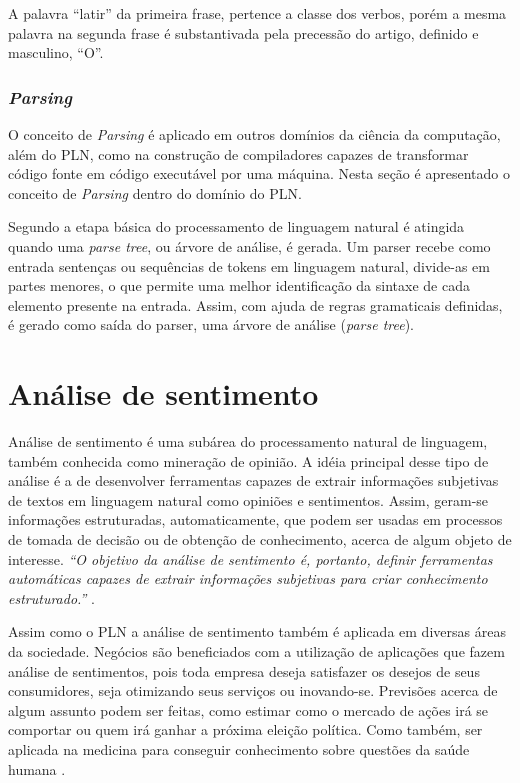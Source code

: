 A palavra “latir” da primeira frase, pertence a classe dos verbos, porém a mesma palavra na segunda frase é substantivada pela precessão do artigo, definido e masculino, “O”.

\subsubsection{\textit{Parsing}}

O conceito de \textit{Parsing} é aplicado em outros domínios da ciência da computação, além do PLN, como na construção de compiladores capazes de transformar código fonte em código executável por uma máquina. Nesta seção é apresentado o conceito de  \textit{Parsing} dentro do domínio do PLN.

Segundo \cite{tecnicasPLNRanjan:16} a etapa básica do processamento de linguagem natural é atingida quando uma \textit{parse tree}, ou árvore de análise, é gerada. Um parser recebe como entrada sentenças ou sequências de tokens em linguagem natural, divide-as em partes menores, o que permite uma melhor identificação da sintaxe de cada elemento presente na entrada. Assim, com ajuda de regras gramaticais definidas, é gerado como saída do parser, uma árvore de análise (\textit{parse tree}).

\section{Análise de sentimento}

Análise de sentimento é uma subárea do processamento natural de linguagem, também conhecida como mineração de opinião. A idéia principal desse tipo de análise é a de desenvolver ferramentas capazes de extrair informações subjetivas de textos em linguagem natural como opiniões e sentimentos. Assim, geram-se informações estruturadas, automaticamente, que podem ser usadas em processos de tomada de decisão ou de obtenção de conhecimento, acerca de algum objeto de interesse. \textit{“O objetivo da análise de sentimento é, portanto, definir ferramentas automáticas capazes de extrair informações subjetivas para criar conhecimento estruturado.”} \cite[tradução do autor]{Pozzi20171}.

Assim como o PLN a análise de sentimento também é aplicada em diversas áreas da sociedade. Negócios são beneficiados com a utilização de aplicações que fazem análise de sentimentos, pois toda empresa deseja satisfazer os desejos de seus consumidores, seja otimizando seus serviços ou inovando-se. Previsões acerca de algum assunto podem ser feitas, como estimar como o mercado de ações irá se comportar ou quem irá ganhar a próxima eleição política. Como também, ser aplicada na medicina para conseguir conhecimento sobre questões da saúde humana \cite{twitterDiabetes2017}.

